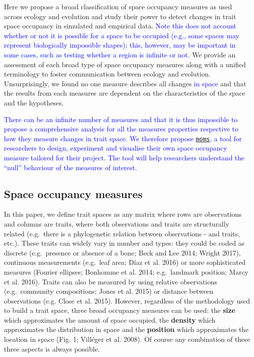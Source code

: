 \documentclass[]{article}
\begin{document}
Here we propose a broad classification of space occupancy measures as
used across ecology and evolution and study their power to detect
changes in trait space occupancy in simulated and empirical data.
\textcolor{blue}{Note this does not account whether or
not it is possible for a space to be occupied (e.g., some spaces may
represent biologically impossible shapes); this, however, may be
important in some cases, such as testing whether a region is infinite or
not.} We provide an assessment of each broad type of space occupancy
measures along with a unified terminology to foster communication
between ecology and evolution. Unsurprisingly, we found no one measure
describes all changes \textcolor{blue}{in space} and
that the results from each measures are dependent on the characteristics
of the space and the hypotheses.

\textcolor{blue}{There can be an infinite number of
measures and that it is thus impossible to propose a comprehensive
analysis for all the measures properties respective to how they measure
changes in trait space. We therefore propose
\href{https://tguillerme.shinyapps.io/moms/}{\texttt{moms}}, a tool for
researchers to design, experiment and visualise their own space
occupancy measure tailored for their project. The tool will help
researchers understand the ``null'' behaviour of the measures of
interest.}

\subsection{Space occupancy measures}\label{space-occupancy-measures}

In this paper, we define trait spaces as any matrix where rows are
observations and columns are traits, where both observations and traits
are structurally related (e.g.~there is a phylogenetic relation between
observations - and traits, etc.). These traits can widely vary in number
and types: they could be coded as discrete (e.g.~presence or absence of
a bone; Beck and Lee 2014; Wright 2017), continuous measurements
(e.g.~leaf area; Díaz et al. 2016) or more sophisticated measures
(Fourier ellipses; Bonhomme et al. 2014; e.g.~landmark position; Marcy
et al. 2016). Traits can also be measured by using relative observations
(e.g.~community compositions; Jones et al. 2015) or distance between
observations (e.g. Close et al. 2015). However, regardless of the
methodology used to build a trait space, three broad occupancy measures
can be used: the \textbf{size} which approximates the amount of space
occupied, the \textbf{density} which approximates the distribution in
space and the \textbf{position} which approximates the location in space
(Fig. 1; Villéger et al. 2008). Of course any combination of these three
aspects is always possible.
\end{document}
